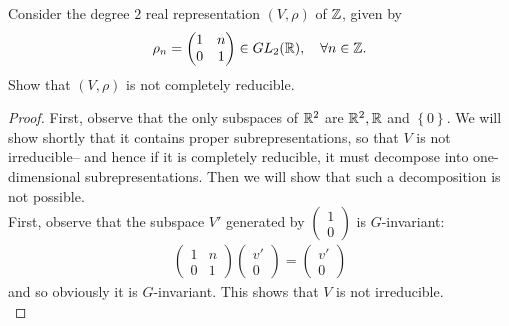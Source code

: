 \documentclass[num=4,duedate=03-03-21,course=Algebra\ II,proflastname=Walton]{hwtemplate}
\begin{document}
\problem[6]
\begin{claim}
	Consider the degree \(2\) real representation \((V,\rho)\) of \(\mathbb{Z}\), given by
	\begin{align*}
		\rho_n = \begin{pmatrix} 1 & n \\ 0 & 1 \end{pmatrix} \in GL_2(\mathbb{R}), \quad \forall n \in \mathbb{Z}.
	\end{align*}
	Show that \((V,\rho)\) is not completely reducible.
\end{claim}

\begin{proof}
First, observe that the only subspaces of \(\mathbb{R}^2\) are \(\mathbb{R}^2,\mathbb{R}\) and \(\left\{ 0 \right\} \). We will show shortly that it contains proper subrepresentations, so that \(V\) is not irreducible-- and hence if it is completely reducible, it must decompose into one-dimensional subrepresentations. Then we will show that such a decomposition is not possible.\\

First, observe that the subspace \(V'\) generated by \(\begin{pmatrix} 1\\0 \end{pmatrix} \) is \(G\)-invariant:
\begin{align*}
	\begin{pmatrix} 1 & n \\ 0 & 1 \end{pmatrix} \begin{pmatrix} v' \\ 0 \end{pmatrix} = \begin{pmatrix}v' \\ 0  \end{pmatrix} 
\end{align*}
and so obviously it is \(G\)-invariant. This shows that \(V\) is not irreducible.\\


\end{proof}
\end{document}
